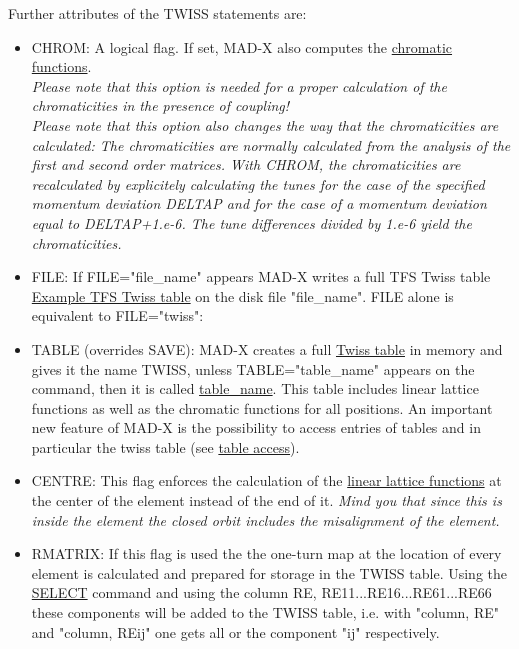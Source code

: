 Further attributes of the TWISS statements are: 
\begin{itemize}

   \item CHROM: A logical flag. If set, MAD-X also computes the
     \href{../Introduction/tables.html#chrom}{chromatic
       functions}.  \\
     \textit{Please note that this option is needed for a proper
       calculation of the chromaticities in the presence of coupling!}\\
     \textit{Please note that this option also changes the way that the
       chromaticities are calculated: The chromaticities are normally
       calculated from the analysis of the first and second order
       matrices. With CHROM, the chromaticities are recalculated by
       explicitely calculating the tunes for the case of the specified momentum
       deviation DELTAP and for the case of a momentum deviation equal
       to DELTAP+1.e-6. The tune differences divided by 1.e-6 yield the
       chromaticities.}

   \item FILE: If FILE="file\_name" appears MAD-X writes a full TFS
     Twiss table \href{../Introduction/select.html#tfs}{Example TFS
       Twiss table} on the disk file "file\_name". FILE alone is
     equivalent to FILE="twiss":  

   \item TABLE (overrides SAVE): MAD-X creates a full
     \href{../Introduction/tables.html#linear}{Twiss table} in
     memory and gives it the name TWISS, unless TABLE="table\_name"
     appears on the command, then it is called
     \href{../Introduction/label.html}{table\_name}. This table
     includes linear lattice functions as well as the chromatic
     functions for all positions. An important new feature of MAD-X
     is the possibility to access entries of tables and in
     particular the twiss table (see
     \href{../Introduction/expression.html#table}{table access}).    

   \item CENTRE: This flag enforces the calculation of the
     \href{../Introduction/tables.html#linear}{linear lattice
       functions} at the center of the element instead of the end
     of it. \textit{ Mind you that since this is inside the element
       the closed orbit includes the misalignment of the element.} 

   \item RMATRIX: If this flag is used the the one-turn map at the
     location of every element is calculated and prepared for
     storage in the TWISS table. Using the
     \href{../Introduction/select.html}{SELECT} command and using
     the column RE, RE11...RE16...RE61...RE66 these components will
     be added to the TWISS table, i.e. with "column, RE" and
     "column, REij" one gets all or the component "ij"
     respectively.    


\end{itemize}

